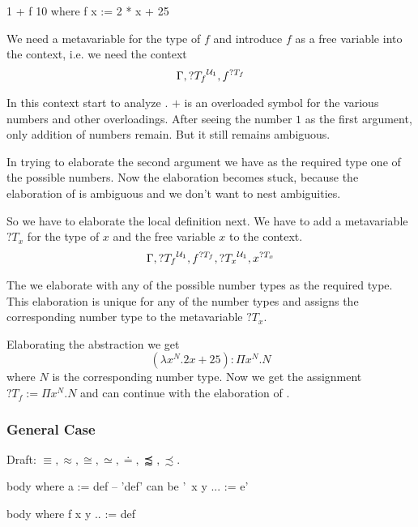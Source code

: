 \begin{alba}
    1 + f 10
    where
        f x := 2 * x + 25
\end{alba}

We need a metavariable for the type of $f$ and introduce $f$ as a free variable
into the context, i.e. we need the context
$$
    \Gamma, {?T_f}^{{\cal{U}}_1}, f^{?T_f}
$$

In this context start to analyze . $+$ is an overloaded symbol
for the various numbers and other overloadings. After seeing the number $1$ as
the first argument, only addition of numbers remain. But it still remains
ambiguous.

In trying to elaborate the second argument  we have as the required
type one of the possible numbers. Now the elaboration becomes stuck, because the
elaboration of  is ambiguous and we don't want to nest ambiguities.

So we have to elaborate the local definition next. We have to add a metavariable
$?T_x$ for the type of $x$ and the free variable $x$ to the context.
$$
    \Gamma, {?T_f}^{{\cal{U}}_1}, f^{?T_f}, {?T_x}^{{\cal{U}}_1}, x^{?T_x}
$$

The we elaborate  with any of the possible number types as the
required type. This elaboration is unique for any of the number types and
assigns the corresponding number type to the metavariable $?T_x$.

Elaborating the abstraction we get
$$
    (\lambda x^N. 2x + 25): \Pi x^N. N
$$
where $N$ is the corresponding number type. Now we get the assignment $?T_f :=
\Pi x^N. N$ and can continue with the elaboration of .


\vskip 5mm
\subsubsection{General Case}

Draft: $\equiv, \approx, \cong, \simeq, \doteq, \precapprox, \precsim$.



\begin{alba}
    body
    where
        a := def   -- 'def' can be '\ x y ... := e'

    body
    where
        f x y .. := def
\end{alba}
